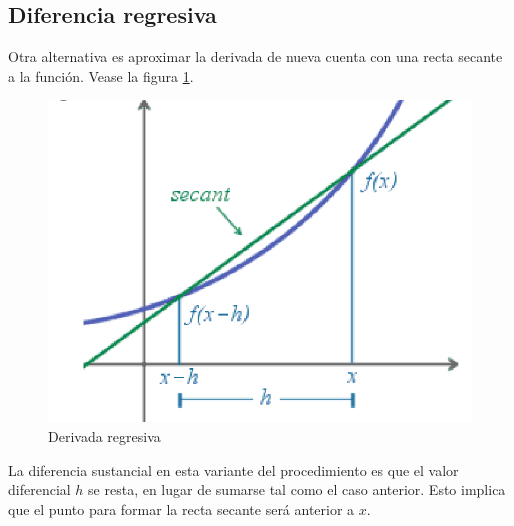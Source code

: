 \subsection{Diferencia regresiva}
Otra alternativa es aproximar la derivada de nueva cuenta con una recta secante a la función. Vease la figura \ref{fig:derivadaRegresiva}.
\begin{figure}[ht]
	\centering
	\includegraphics[scale=0.35]{img/derivadaRegresiva.png}
	\caption{Derivada regresiva}
	\label{fig:derivadaRegresiva}
\end{figure}

La diferencia sustancial en esta variante del procedimiento es que el valor diferencial $h$ se resta, en lugar de sumarse tal como el caso
anterior. Esto implica que el punto para formar la recta secante será anterior a $x$.

